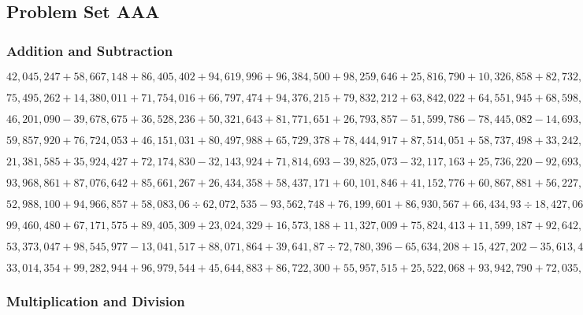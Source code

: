 \hypertarget{problem-set-aaa-9}{%
\subsection{Problem Set AAA}\label{problem-set-aaa-9}}

\hypertarget{addition-and-subtraction-365}{%
\subsubsection{Addition and
Subtraction}\label{addition-and-subtraction-365}}

\(42,045,247+58,667,148+86,405,402+94,619,996+96,384,500+98,259,646+25,816,790+10,326,858+82,732,994+57,997,765\)

\(75,495,262+14,380,011+71,754,016+66,797,474+94,376,215+79,832,212+63,842,022+64,551,945+68,598,044+34,868,907\)

\(46,201,090-39,678,675+36,528,236+50,321,643+81,771,651+26,793,857-51,599,786-78,445,082-14,693,733+21,330,882\)

\(59,857,920+76,724,053+46,151,031+80,497,988+65,729,378+78,444,917+87,514,051+58,737,498+33,242,955+28,352,605\)

\(21,381,585+35,924,427+72,174,830-32,143,924+71,814,693-39,825,073-32,117,163+25,736,220-92,693,725+99,569,969\)

\(93,968,861+87,076,642+85,661,267+26,434,358+58,437,171+60,101,846+41,152,776+60,867,881+56,227,589+34,417,354\)

\(52,988,100+94,966,857+58,083,06÷62,072,535-93,562,748+76,199,601+86,930,567+66,434,93÷18,427,063-70,508,806\)

\(99,460,480+67,171,575+89,405,309+23,024,329+16,573,188+11,327,009+75,824,413+11,599,187+92,642,469+80,514,491\)

\(53,373,047+98,545,977-13,041,517+88,071,864+39,641,87÷72,780,396-65,634,208+15,427,202-35,613,480+93,488,089\)

\(33,014,354+99,282,944+96,979,544+45,644,883+86,722,300+55,957,515+25,522,068+93,942,790+72,035,909+87,704,023\)

\hypertarget{multiplication-and-division-364}{%
\subsubsection{Multiplication and
Division}\label{multiplication-and-division-364}}

